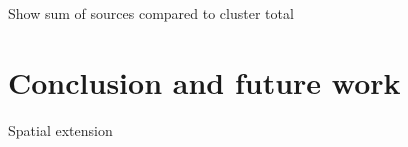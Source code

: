 Show sum of sources compared to cluster total


\section{Conclusion and future work}

Spatial extension

%
%
